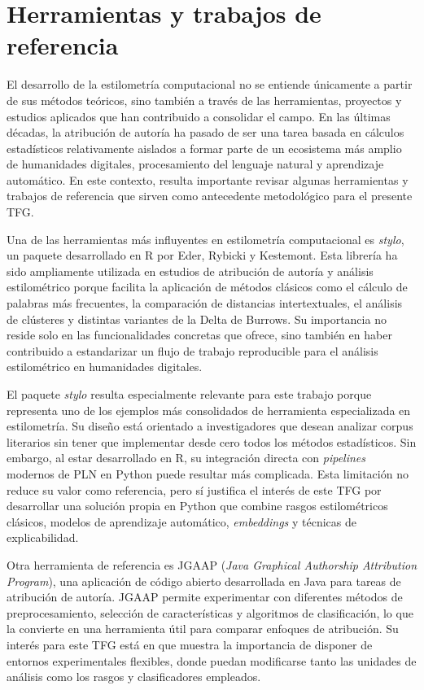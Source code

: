 \documentclass[IB]{TFUOC}%
\begin{document}
\section{Herramientas y trabajos de referencia}

El desarrollo de la estilometría computacional no se entiende únicamente a partir de sus métodos teóricos, sino también a través de las herramientas, proyectos y estudios aplicados que han contribuido a consolidar el campo. En las últimas décadas, la atribución de autoría ha pasado de ser una tarea basada en cálculos estadísticos relativamente aislados a formar parte de un ecosistema más amplio de humanidades digitales, procesamiento del lenguaje natural y aprendizaje automático. En este contexto, resulta importante revisar algunas herramientas y trabajos de referencia que sirven como antecedente metodológico para el presente TFG.

Una de las herramientas más influyentes en estilometría computacional es \textit{stylo}, un paquete desarrollado en R por Eder, Rybicki y Kestemont\cite{eder2016stylometry}. Esta librería ha sido ampliamente utilizada en estudios de atribución de autoría y análisis estilométrico porque facilita la aplicación de métodos clásicos como el cálculo de palabras más frecuentes, la comparación de distancias intertextuales, el análisis de clústeres y distintas variantes de la Delta de Burrows. Su importancia no reside solo en las funcionalidades concretas que ofrece, sino también en haber contribuido a estandarizar un flujo de trabajo reproducible para el análisis estilométrico en humanidades digitales.

El paquete \textit{stylo} resulta especialmente relevante para este trabajo porque representa uno de los ejemplos más consolidados de herramienta especializada en estilometría. Su diseño está orientado a investigadores que desean analizar corpus literarios sin tener que implementar desde cero todos los métodos estadísticos. Sin embargo, al estar desarrollado en R, su integración directa con \textit{pipelines} modernos de PLN en Python puede resultar más complicada. Esta limitación no reduce su valor como referencia, pero sí justifica el interés de este TFG por desarrollar una solución propia en Python que combine rasgos estilométricos clásicos, modelos de aprendizaje automático, \textit{embeddings} y técnicas de explicabilidad.

Otra herramienta de referencia es JGAAP (\textit{Java Graphical Authorship Attribution Program}), una aplicación de código abierto desarrollada en Java para tareas de atribución de autoría\cite{jgaap2024}. JGAAP permite experimentar con diferentes métodos de preprocesamiento, selección de características y algoritmos de clasificación, lo que la convierte en una herramienta útil para comparar enfoques de atribución. Su interés para este TFG está en que muestra la importancia de disponer de entornos experimentales flexibles, donde puedan modificarse tanto las unidades de análisis como los rasgos y clasificadores empleados.
\end{document}
